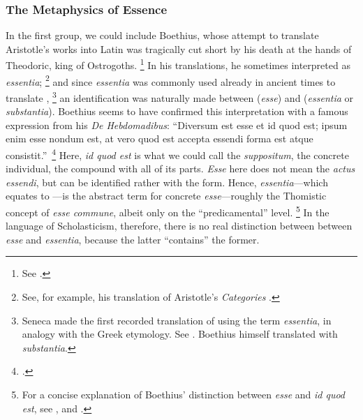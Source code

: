 \subsubsection{The Metaphysics of Essence}

In the first group, we could include Boethius, whose attempt to translate Aristotle's works into Latin was tragically cut short by his death at the hands of Theodoric, king of Ostrogoths.%
\footnote{See \cite[458]{fabro:intensive}.}
%
In his translations, he sometimes interpreted  as \emph{essentia};%
%
\suppressPagesNextCite%
\footnote{See, for example, his translation of Aristotle's \emph{Categories} \parencite[285D--286C {[=, 14b10--25 in Aristotle]}]{boethius:categories}.}
%
and since \emph{essentia} was commonly used already in ancient times to translate ,%
%
\footnote{Seneca made the first recorded translation of  using the term \emph{essentia}, in analogy with the Greek etymology. See \cite[339-340]{gilson:letre}. Boethius himself translated  with \emph{substantia}.} an identification was naturally made between  (\emph{esse}) and  (\emph{essentia} or \emph{substantia}). Boethius seems to have confirmed this interpretation with a famous expression from his \emph{De Hebdomadibus}: ``Diversum est esse et id quod est; ipsum enim esse nondum est, at vero quod est accepta essendi forma est atque consistit.''\,%
\footcite[1311B]{boethius:dehebodmadibus}
Here, \emph{id quod est} is what we could call the \emph{suppositum}, the concrete individual, the compound with all of its parts. \emph{Esse} here does not mean the \emph{actus essendi}, but can be identified rather with the form. Hence, \emph{essentia}---which equates to ---is the abstract term for concrete \emph{esse}---roughly the Thomistic concept of \emph{esse commune}, albeit only on the ``predicamental'' level.%
%
\footnote{For a concise explanation of Boethius' distinction between \emph{esse} and \emph{id quod est}, see \cite[105]{gilson:history}, and \cite[83--85]{definance:etre-et-agir}.}  In the language of Scholasticism, therefore, there is no real distinction between between \emph{esse} and \emph{essentia}, because the latter ``contains'' the former.


